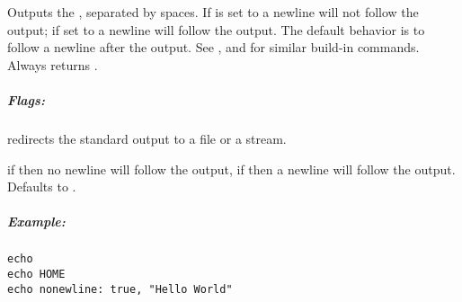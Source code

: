 \label{par:echo}

Outputs the , separated by spaces. If 
is set to  a newline will not follow the output; if set to 
a newline will follow the output. The default behavior is to follow a newline after the output.
See  ,  
and   for similar build-in commands.
Always returns .

\subparagraph{Flags:}

\begin{asparaitem}
\item[\code{out: Object|File|Stream}] redirects the standard output to a
file or a stream.

\item[\code{nonewline: true|false}] if  then no newline will follow the output,
if  then a newline will follow the output. Defaults to .
\end{asparaitem}

\subparagraph{Example:}

\begin{lstlisting}[style=Groovybash, label={lst:example_echo}]
echo
echo HOME
echo nonewline: true, "Hello World"
\end{lstlisting}

